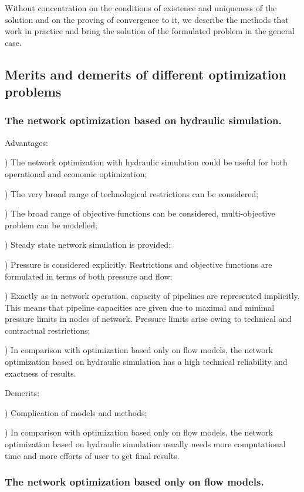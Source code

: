 \documentclass{article}
\begin{document}
Without concentration on the conditions of existence and uniqueness of the
solution and on the proving of convergence to it, we describe the methods
that work in practice and bring the solution of the formulated problem in
the general case.

\subsection{Merits and demerits of different optimization problems}

\subsubsection{The network optimization based on hydraulic simulation.}

Advantages:

) The network optimization with hydraulic simulation could be useful
for both operational and economic optimization;

) The very broad range of technological restrictions can be
considered;

) The broad range of objective functions can be considered,
multi-objective problem can be modelled;

) Steady state network simulation is provided;

) Pressure is considered explicitly. Restrictions and objective
functions are formulated in terms of both pressure and flow;

) Exactly as in network operation, capacity of pipelines are
represented implicitly. This means that pipeline capacities are given due to
maximal and minimal pressure limits in nodes of network. Pressure limits
arise owing to technical and contractual restrictions;

) In comparison with optimization based only on flow models, the
network optimization based on hydraulic simulation has a high technical
reliability and exactness of results.

Demerits:

) Complication of models and methods;

) In comparison with optimization based only on flow models, the
network optimization based on hydraulic simulation usually needs more
computational time and more efforts of user to get final results.

\subsubsection{The network optimization based only on flow models.}
\end{document}

